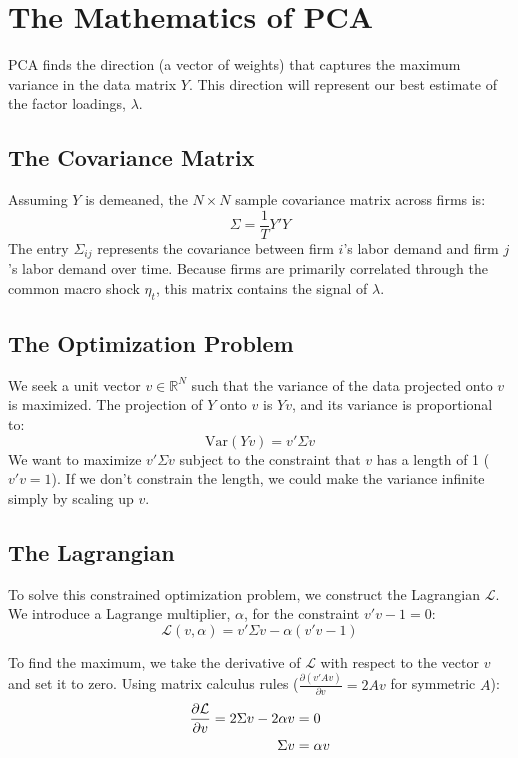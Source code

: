 \documentclass[11pt]{article}
\begin{document}
\section{The Mathematics of PCA}

PCA finds the direction (a vector of weights) that captures the maximum variance in the data matrix $Y$. This direction will represent our best estimate of the factor loadings, $\lambda$.

\subsection{The Covariance Matrix}
Assuming $Y$ is demeaned, the $N \times N$ sample covariance matrix across firms is:
\begin{equation}
    \Sigma = \frac{1}{T} Y'Y
\end{equation}
The entry $\Sigma_{ij}$ represents the covariance between firm $i$'s labor demand and firm $j$'s labor demand over time. Because firms are primarily correlated through the common macro shock $\eta_t$, this matrix contains the signal of $\lambda$.

\subsection{The Optimization Problem}
We seek a unit vector $v \in \mathbb{R}^N$ such that the variance of the data projected onto $v$ is maximized. The projection of $Y$ onto $v$ is $Yv$, and its variance is proportional to:
\begin{equation}
    \text{Var}(Yv) = v' \Sigma v
\end{equation}
We want to maximize $v' \Sigma v$ subject to the constraint that $v$ has a length of 1 ($v'v = 1$). If we don't constrain the length, we could make the variance infinite simply by scaling up $v$.

\subsection{The Lagrangian}
To solve this constrained optimization problem, we construct the Lagrangian $\mathcal{L}$. We introduce a Lagrange multiplier, $\alpha$, for the constraint $v'v - 1 = 0$:
\begin{equation}
    \mathcal{L}(v, \alpha) = v' \Sigma v - \alpha (v'v - 1)
\end{equation}

To find the maximum, we take the derivative of $\mathcal{L}$ with respect to the vector $v$ and set it to zero. Using matrix calculus rules ($\frac{\partial (v' A v)}{\partial v} = 2Av$ for symmetric $A$):
\begin{align}
    \frac{\partial \mathcal{L}}{\partial v} = 2 \Sigma v - 2 \alpha v &= 0 \notag \\
    \Sigma v &= \alpha v \label{eq:eigen}
\end{align}
\end{document}
